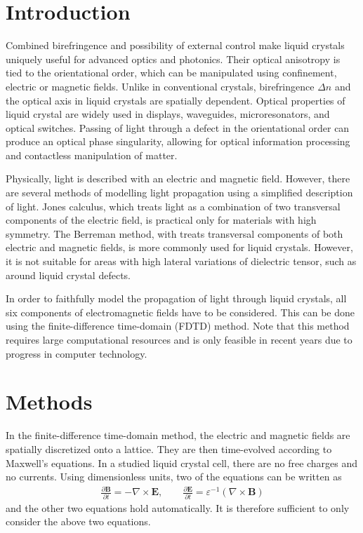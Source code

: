 \documentclass[a4paper,10pt]{article}
\newcommand{\odvod}[2]{\frac{\partial #1}{\partial #2}}
\renewcommand{\vec}{\mathbf}
\newcommand{\eps}{\varepsilon}
\begin{document}
\begin{multicols}{2}

\section{Introduction}

Combined birefringence and possibility of external control make liquid crystals uniquely useful for advanced optics and photonics\cite{optics-lcd}. 
Their optical anisotropy is tied to the orientational order, which can be manipulated using confinement, electric or magnetic fields\cite{ravnik-zumer-ldg}. 
Unlike in conventional crystals, birefringence $\Delta n$ and the optical axis in liquid crystals are spatially dependent. 
Optical properties of liquid crystal are widely used in displays, waveguides, microresonators, and optical switches\cite{coles-morris,humar-musevic}. 
Passing of light through a defect in the orientational order can produce an optical phase singularity, allowing for optical information processing and contactless manipulation of matter\cite{brasselet-droplet}. 

Physically, light is described with an electric and magnetic field. 
However, there are several methods of modelling light propagation using a simplified description of light. 
Jones calculus, which treats light as a combination of two transversal components of the electric field, is practical only for materials with high symmetry\cite{berreman}. 
The Berreman method, with treats transversal components of both electric and magnetic fields, is more commonly used for liquid crystals. 
However, it is not suitable for areas with high lateral variations of dielectric tensor, such as around liquid crystal defects\cite{hwang-rey}. 

In order to faithfully model the propagation of light through liquid crystals, all six components of electromagnetic fields have to be considered. 
This can be done using the finite-difference time-domain (\textsc{FDTD}) method\cite{taflove,hwang-rey}. 
Note that this method requires large computational resources and is only feasible in recent years due to progress in computer technology. 

\section{Methods}
In the finite-difference time-domain method, the electric and magnetic fields are spatially discretized onto a lattice. 
They are then time-evolved according to Maxwell's equations\cite{taflove}. 
In a studied liquid crystal cell, there are no free charges and no currents. 
Using dimensionless units, two of the equations can be written as
\begin{align}
\label{eq:maxwell}
 \odvod{\vec{B}}{t} = -\nabla \times \vec{E}, \qquad \odvod{\vec{E}}{t} = \eps^{-1} (\nabla \times \vec{B})
\end{align}
and the other two equations hold automatically. 
It is therefore sufficient to only consider the above two equations. 


\end{multicols}
\end{document}
